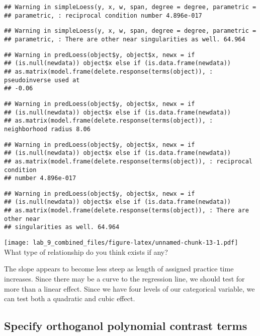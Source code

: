 \documentclass[]{article}
\begin{document}
\begin{verbatim}
## Warning in simpleLoess(y, x, w, span, degree = degree, parametric =
## parametric, : reciprocal condition number 4.896e-017
\end{verbatim}

\begin{verbatim}
## Warning in simpleLoess(y, x, w, span, degree = degree, parametric =
## parametric, : There are other near singularities as well. 64.964
\end{verbatim}

\begin{verbatim}
## Warning in predLoess(object$y, object$x, newx = if
## (is.null(newdata)) object$x else if (is.data.frame(newdata))
## as.matrix(model.frame(delete.response(terms(object)), : pseudoinverse used at
## -0.06
\end{verbatim}

\begin{verbatim}
## Warning in predLoess(object$y, object$x, newx = if
## (is.null(newdata)) object$x else if (is.data.frame(newdata))
## as.matrix(model.frame(delete.response(terms(object)), : neighborhood radius 8.06
\end{verbatim}

\begin{verbatim}
## Warning in predLoess(object$y, object$x, newx = if
## (is.null(newdata)) object$x else if (is.data.frame(newdata))
## as.matrix(model.frame(delete.response(terms(object)), : reciprocal condition
## number 4.896e-017
\end{verbatim}

\begin{verbatim}
## Warning in predLoess(object$y, object$x, newx = if
## (is.null(newdata)) object$x else if (is.data.frame(newdata))
## as.matrix(model.frame(delete.response(terms(object)), : There are other near
## singularities as well. 64.964
\end{verbatim}

\texttt{[image: lab\_9\_combined\_files/figure-latex/unnamed-chunk-13-1.pdf]}
What type of relationship do you think exists if any?

The slope appears to become less steep as length of assigned practice
time increases. Since there may be a curve to the regression line, we
should test for more than a linear effect. Since we have four levels of
our categorical variable, we can test both a quadratic and cubic effect.

\subsection{Specify orthoganol polynomial contrast
terms}\label{specify-orthoganol-polynomial-contrast-terms}
\end{document}
